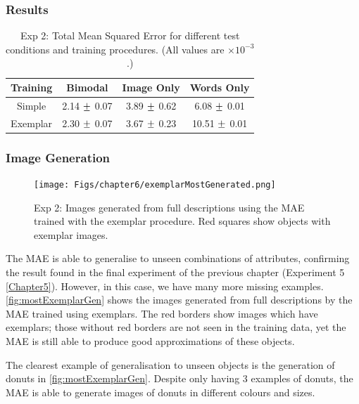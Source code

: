 \subsubsection{Results}

\begin{table}[h!]
\centering
	\begin{tabular}{|c|c|c|c|}
	\hline
\textbf{Training} & 	\textbf{Bimodal} & 	\textbf{Image Only} 	& 	\textbf{Words Only} \\ \hline
Simple &  2.14 $\mypm$	0.07 & 3.89 $\mypm$	0.62 & 6.08 $\mypm$ 0.01 \\ \hline
Exemplar & 2.30 $\mypm$ 0.07 & 3.67 $\mypm$ 0.23
& 10.51	$\mypm$ 0.01 \\ \hline

\end{tabular}
\caption{Exp 2: Total Mean Squared Error for different test conditions and training procedures. (All values are $\times10^{-3}$.)}
\label{tab:6_res_exp2}
\end{table}


\subsubsection{Image Generation}
\begin{figure}[ht]
    \centering
    \texttt{[image: Figs/chapter6/exemplarMostGenerated.png]}
    \caption{Exp 2: Images generated from full descriptions using the MAE trained with the exemplar procedure. Red squares show objects with exemplar images.}
    \label{fig:mostExemplarGen}
\end{figure}

The MAE is able to generalise to unseen combinations of attributes, confirming the result found in the final experiment of the previous chapter (Experiment 5 \autoref{Chapter5}). However, in this case, we have many more missing examples. \autoref{fig:mostExemplarGen} shows the images generated from full descriptions by the MAE trained using exemplars. The red borders show images which have exemplars; those without red borders are not seen in the training data, yet the MAE is still able to produce good approximations of these objects.

The clearest example of generalisation to unseen objects is the generation of donuts in \autoref{fig:mostExemplarGen}. Despite only having 3 examples of donuts, the MAE is able to generate images of donuts in different colours and sizes.  


